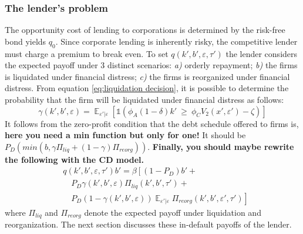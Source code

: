 \documentclass[12pt]{article}
\DeclareMathOperator{\E}{\mathbb{E}}
\begin{document}
\subsubsection{The lender's problem}
The opportunity cost of lending to corporations is determined by the risk-free bond yields $q_0$. Since corporate lending is inherently risky, the competitive lender must charge a premium to break even. To set $q(k',b',\varepsilon, \tau')$ the lender considers the expected payoff under 3 distinct scenarios: \textit{a)} orderly repayment; \textit{b)} the firms is liquidated under financial distress; \textit{c)} the firms is reorganized under financial distress. From equation \ref{eq:liquidation decision}, it is possible to determine the probability that the firm will be liquidated under financial distress as follows: 
\begin{equation} \label{eq:liquidation probability}
    \gamma(k',b',\varepsilon) = \E_{\varepsilon'|\varepsilon}[\mathds{1}(\phi_A (1-\delta) k'  \  \geq \ \phi_C V_2(x',\varepsilon')- \zeta)]  
\end{equation}
It follows from the zero-profit condition that the debt schedule offered to firms is, \textbf{here you need a min function but only for one!} It should be $P_D(min(b, \gamma \Pi_{liq} + (1-\gamma)\Pi_{reorg}))$. \textbf{Finally, you should maybe rewrite the following with the CD model.}
\begin{equation} \label{eq:q}
    \begin{split}
        & q(k',b', \varepsilon, \tau')b' =  \beta \left[ (1-P_D)b' + \right. \\
        & \quad P_D \gamma(k',b',\varepsilon) \Pi_{liq}(k',b', \tau') +  \\
        & \quad \left. P_D (1-\gamma(k',b',\varepsilon)) \E_{\varepsilon'|\varepsilon} \Pi_{reorg}(k',b', \varepsilon', \tau') \right] 
    \end{split}
 \end{equation}
where $\Pi_{liq}$ and $\Pi_{reorg}$ denote the expected payoff under liquidation and reorganization. The next section discusses these in-default payoffs of the lender. 
\end{document}
